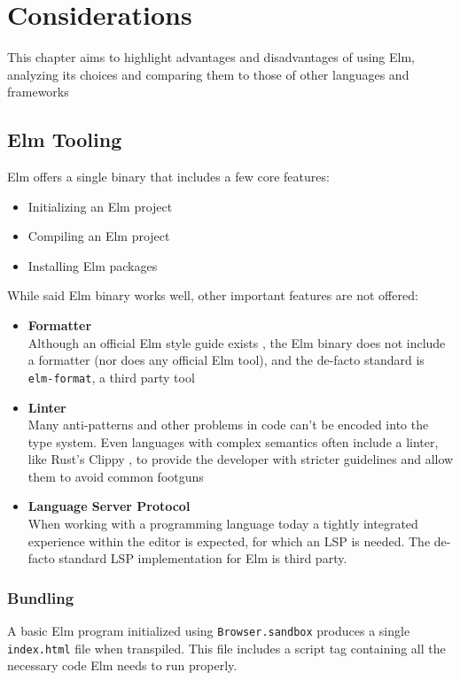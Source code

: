 \chapter{Considerations}
This chapter aims to highlight advantages and disadvantages of using Elm, analyzing its choices and comparing them to those of other languages and frameworks

\section{Elm Tooling}
Elm offers a single binary that includes a few core features:
\begin{itemize}
    \item Initializing an Elm project
    \item Compiling an Elm project
    \item Installing Elm packages
\end{itemize}

While said Elm binary works well, other important features are not offered:
\begin{itemize}
    \item \textbf{Formatter}\\Although an official Elm style guide exists \cite{noauthor_style_nodate}, the Elm binary does not include a formatter (nor does any official Elm tool), and the de-facto standard is \texttt{elm-format}, a third party tool \cite{vonderhaar_avh4elm-format_2024}
    \item \textbf{Linter}\\Many anti-patterns and other problems in code can't be encoded into the type system. Even languages with complex semantics often include a linter, like Rust's Clippy \cite{noauthor_rust-langrust-clippy_2024}, to provide the developer with stricter guidelines and allow them to avoid common footguns
    \item \textbf{Language Server Protocol}\\When working with a programming language today a tightly integrated experience within the editor is expected, for which an LSP is needed. The de-facto standard LSP implementation for Elm is third party. \cite{noauthor_elm-toolingelm-language-server_nodate}
\end{itemize}

\subsection{Bundling}
A basic Elm program initialized using \texttt{Browser.sandbox} produces a single \texttt{index.html} file when transpiled. This file includes a script tag containing all the necessary code Elm needs to run properly.\\

